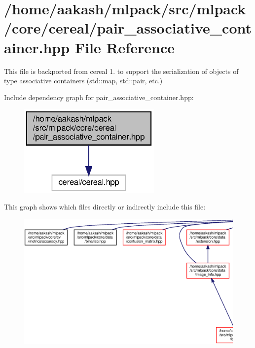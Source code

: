 \section{/home/aakash/mlpack/src/mlpack/core/cereal/pair\+\_\+associative\+\_\+container.hpp File Reference}
\label{pair__associative__container_8hpp}


This file is backported from cereal 1. to support the serialization of objects of type associative containers (std\+::map, std\+::pair, etc.)  


Include dependency graph for pair\+\_\+associative\+\_\+container.\+hpp\+:
\nopagebreak
\begin{figure}[H]
\begin{center}
\leavevmode
\includegraphics[width=198pt]{pair__associative__container_8hpp__incl}
\end{center}
\end{figure}
This graph shows which files directly or indirectly include this file\+:
\nopagebreak
\begin{figure}[H]
\begin{center}
\leavevmode
\includegraphics[width=350pt]{pair__associative__container_8hpp__dep__incl}
\end{center}
\end{figure}
